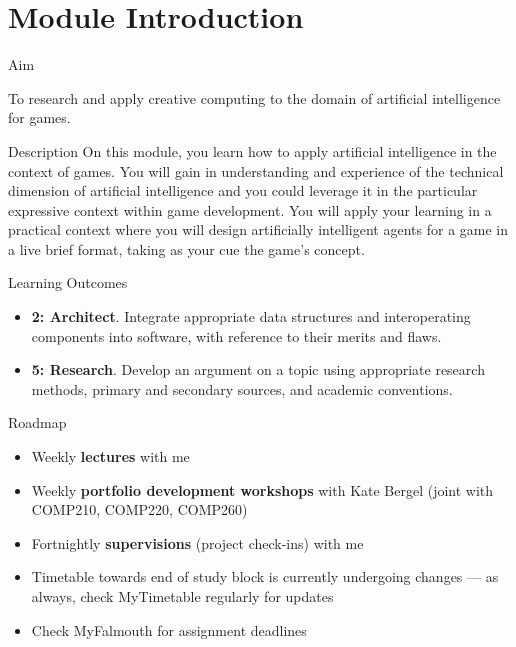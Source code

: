 \part{Module Introduction}
\frame{\partpage}

\begin{frame}{Aim}
    \begin{center}
        To research and apply creative computing to the domain of artificial intelligence for games.
    \end{center}
\end{frame}

\begin{frame}{Description}
    On this module, you learn how to apply artificial intelligence in the context of games. You will gain in understanding and experience of the technical dimension of artificial intelligence and you could leverage it in the particular expressive context within game development. You will apply your learning in a practical context where you will design artificially intelligent agents for a game in a live brief format, taking as your cue the game’s concept.
\end{frame}

\begin{frame}{Learning Outcomes}
    \begin{itemize}
        \item \textbf{2: Architect}. Integrate appropriate data structures and interoperating components into software, with reference to their merits and flaws.
        \item \textbf{5: Research}. Develop an argument on a topic using appropriate research methods, primary and secondary sources, and academic conventions.
    \end{itemize}
\end{frame}

\begin{frame}{Roadmap}
    \begin{itemize}
        \pause\item Weekly \textbf{lectures} with me
        \pause\item Weekly \textbf{portfolio development workshops} with Kate Bergel (joint with COMP210, COMP220, COMP260)
        \pause\item Fortnightly \textbf{supervisions} (project check-ins) with me
        \pause\item Timetable towards end of study block is currently undergoing changes --- as always, check MyTimetable regularly for updates
        \pause\item Check MyFalmouth for assignment deadlines
    \end{itemize}
\end{frame}
